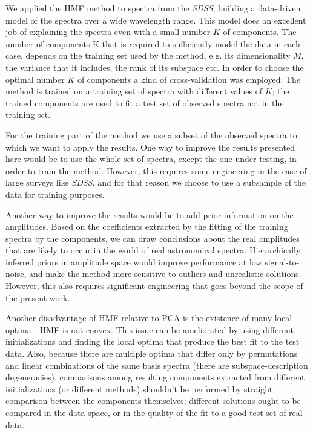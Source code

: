 \documentclass[12pt,preprint]{aastex}
\newcommand{\project}[1]{\textsl{#1}}
\newcommand{\sdss}{\project{SDSS}}
\newcommand{\SDSS}{\sdss}
\begin{document}
We applied the HMF method to spectra from the \SDSS, building a data-driven
model of the spectra over a wide wavelength range.  This model does an
excellent job of explaining the spectra even with a small number $K$
of components.  The number of components K that is required to 
sufficiently model the data in each case, depends on the training set 
used by the method, e.g. its dimensionality $M$, the variance that it 
includes, the rank of its subspace etc. In order to choose the optimal 
number $K$ of components a kind of cross-validation was employed: The 
method is trained on a training set of spectra with different values 
of $K$; the trained components are used to fit a test set of observed 
spectra not in the training set.

For the training part of the method we use a subset of the observed
spectra to which we want to apply the results. One way to improve the
results presented here would be to use the whole set of spectra,
except the one under testing, in order to train the method. However,
this requires some engineering in the case of large surveys like
\SDSS, and for that reason we choose to use a subsample of the data
for training purposes.

Another way to improve the results would be to add prior information
on the amplitudes. Based on the coefficients extracted by the fitting
of the training spectra by the components, we can draw conclusions
about the real amplitudes that are likely to occur in the world of
real astronomical spectra.  Hierarchically inferred priors in
amplitude space would improve performance at low signal-to-noise, and
make the method more sensitive to outliers and unrealistic solutions.
However, this also requires significant engineering that goes beyond
the scope of the present work.

Another disadvantage of HMF relative to PCA is the existence of many
local optima---HMF is not convex.  This issue can be ameliorated by
using different initializations and finding the local optima that
produce the best fit to the test data.  Also, because there are
multiple optima that differ only by permutations and linear
combinations of the same basis spectra (there are subspace-description
degeneracies), comparisons among resulting components extracted from
different initializations (or different methods) shouldn't be performed
by straight comparison between the components themselves; different
solutions ought to be compared in the data space, or in the quality of
the fit to a good test set of real data.
\end{document}
